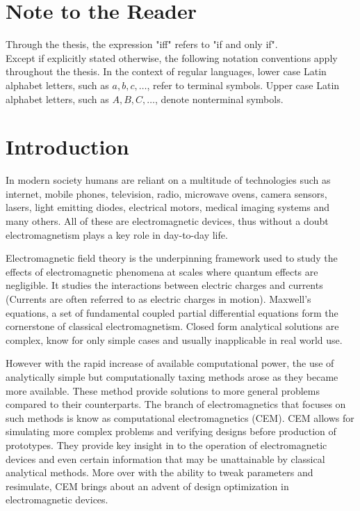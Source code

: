 
% 

\chapter{Note to the Reader}
Through the thesis, the expression "iff" refers to "if and only if".\\
Except if explicitly stated otherwise, the following notation conventions apply throughout the thesis. 
In the context of regular languages, lower case Latin alphabet letters, such as $a, b, c, \dots$, refer to terminal symbols. Upper case Latin alphabet letters, such as $A, B, C,\dots$, denote nonterminal symbols.

\chapter{Introduction}
In modern society humans are reliant on a multitude of technologies such as internet, mobile phones, television, radio, microwave ovens, camera sensors, lasers, light emitting diodes, electrical motors, medical imaging systems and many others. All of these are electromagnetic devices, thus without a doubt electromagnetism plays a key role in day-to-day life.

Electromagnetic field theory is the underpinning framework used to study the effects of electromagnetic phenomena at scales where quantum effects are negligible. It studies the interactions between electric charges and currents (Currents are often referred to as electric charges in motion). Maxwell's equations, a set of fundamental coupled partial differential equations form the cornerstone of classical electromagnetism. Closed form analytical solutions are complex, know for only simple cases and usually inapplicable in real world use.

However with the rapid increase of available computational power, the use of analytically simple but computationally taxing methods arose as they became more available. These method provide solutions to more general problems compared to their counterparts. The branch of electromagnetics that focuses on such methods is know as computational electromagnetics (CEM). CEM allows for simulating more complex problems and verifying designs before production of prototypes. They provide key insight in to the operation of electromagnetic devices and even certain information that may be unattainable by classical analytical methods. More over with the ability to tweak parameters and resimulate, CEM brings about an advent of design optimization in electromagnetic devices.

